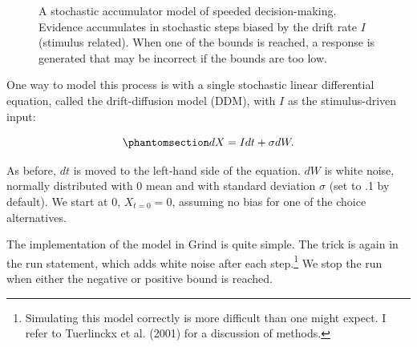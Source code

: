 \documentclass[
  a4paper,
  DIV=11,
  numbers=noendperiod,
  oneside]{scrreprt}
\begin{document}
\begin{figure}


\caption{\label{fig-ch4n-img7-old-55}A stochastic accumulator model of
speeded decision-making. Evidence accumulates in stochastic steps biased
by the drift rate \(I\) (stimulus related). When one of the bounds is
reached, a response is generated that may be incorrect if the bounds are
too low.}

\end{figure}%

One way to model this process is with a single stochastic linear
differential equation, called the drift-diffusion model (DDM), with
\(I\) as the stimulus-driven input:

\begin{equation}\phantomsection\label{eq-ch4n-6-old-26}{
dX = Idt + \sigma dW.
}\end{equation}

As before, \(dt\) is moved to the left-hand side of the equation. \(dW\)
is white noise, normally distributed with 0 mean and with standard
deviation \(\sigma\) (set to .1 by default). We start at 0,
\(X_{t = 0} = 0\), assuming no bias for one of the choice alternatives.

The implementation of the model in Grind is quite simple. The trick is
again in the run statement, which adds white noise after each
step.\footnote{Simulating this model correctly is more difficult than
  one might expect. I refer to Tuerlinckx et al. (2001) for a discussion
  of methods.} We stop the run when either the negative or positive
bound is reached.
\end{document}
